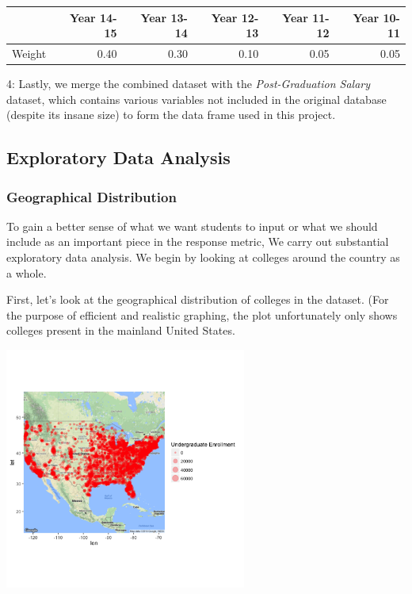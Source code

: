\documentclass{article}\usepackage[]{graphicx}\usepackage[]{color}
\newenvironment{knitrout}{}{} %
\begin{document}
\begin{table}[ht]
\centering
\begin{tabular}{rrrrrr}
  \hline
 & Year 14-15 & Year 13-14 & Year 12-13 & Year 11-12 & Year 10-11 \\ 
  \hline
Weight & 0.40 & 0.30 & 0.10 & 0.05 & 0.05 \\ 
   \hline
\end{tabular}
\end{table}


4: Lastly, we merge the combined dataset with the \emph{Post-Graduation Salary} dataset, which contains various variables not included in the original database (despite its insane size) to form the data frame used in this project. 

\subsection{Exploratory Data Analysis}

\subsubsection{Geographical Distribution}
To gain a better sense of what we want students to input or what we should include as an important piece in the response metric, We carry out substantial exploratory data analysis. We begin by looking at colleges around the country as a whole.\newline

First, let's look at the geographical distribution of colleges in the dataset. (For the purpose of efficient  and realistic graphing, the plot unfortunately only shows colleges present in the mainland United States.

\begin{knitrout}
\color{fgcolor}

{\centering \includegraphics[width=300px]{../images/ggmap-schoolDistribution} 

}



\end{knitrout}
\end{document}
